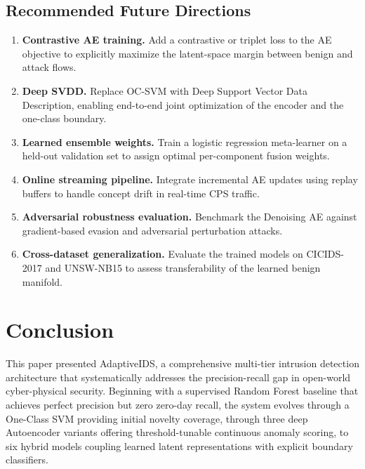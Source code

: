 \documentclass[10pt,journal,compsoc]{IEEEtran}
\begin{document}
\subsection{Recommended Future Directions}

\begin{enumerate}[leftmargin=*,noitemsep,topsep=2pt]
  \item \textbf{Contrastive AE training.}  Add a contrastive or
    triplet loss to the AE objective to explicitly maximize the
    latent-space margin between benign and attack flows.
  \item \textbf{Deep SVDD.}  Replace OC-SVM with Deep Support Vector
    Data Description, enabling end-to-end joint optimization of the
    encoder and the one-class boundary.
  \item \textbf{Learned ensemble weights.}  Train a logistic regression
    meta-learner on a held-out validation set to assign optimal
    per-component fusion weights.
  \item \textbf{Online streaming pipeline.}  Integrate incremental
    AE updates using replay buffers to handle concept drift in
    real-time CPS traffic.
  \item \textbf{Adversarial robustness evaluation.}  Benchmark the
    Denoising AE against gradient-based evasion and adversarial
    perturbation attacks.
  \item \textbf{Cross-dataset generalization.}  Evaluate the trained
    models on CICIDS-2017 and UNSW-NB15 to assess transferability
    of the learned benign manifold.
\end{enumerate}

\section{Conclusion}
\label{sec:conclusion}

This paper presented AdaptiveIDS, a comprehensive multi-tier intrusion
detection architecture that systematically addresses the
precision-recall gap in open-world cyber-physical security.  Beginning
with a supervised Random Forest baseline that achieves perfect precision
but zero zero-day recall, the system evolves through a One-Class SVM
providing initial novelty coverage, through three deep Autoencoder
variants offering threshold-tunable continuous anomaly scoring, to six
hybrid models coupling learned latent representations with explicit
boundary classifiers.
\end{document}
